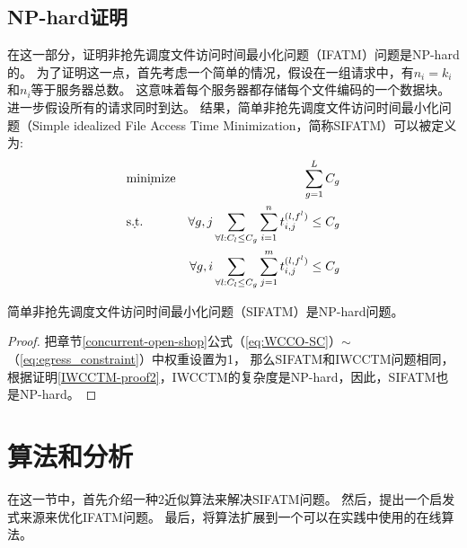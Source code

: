 \subsection{NP-hard证明}
在这一部分，证明非抢先调度文件访问时间最小化问题（IFATM）问题是NP-hard的。
为了证明这一点，首先考虑一个简单的情况，假设在一组请求中，有$n_i = k_i $和$n_i $等于服务器总数。
这意味着每个服务器都存储每个文件编码的一个数据块。
进一步假设所有的请求同时到达。
结果，简单非抢先调度文件访问时间最小化问题（Simple idealized File Access Time
Minimization，简称SIFATM）可以被定义为:
 \begin{eqnarray}
&\d {\rm minimize} & \sum_{g=1}^{L} C_{g} \label{eq:simple_ECSF-SC} \\
& \d{\rm s.t.} &\forall g,j\sum_{\forall l:C_l \leq C_g}\sum_{i=1}^{n}t_{i,j}^{(l,f^l)}\leq C_g  \label{eq:simple_ingress_constraint}\\
&&\forall g,i\sum_{\forall l:C_l \leq C_g}\sum_{j=1}^{m}t_{i,j}^{(l,f^l)} \leq C_g   \label{eq:simple_egress_constraint}
\end{eqnarray}

 \begin{lemma}\label{theorem-SIFATM}
简单非抢先调度文件访问时间最小化问题（SIFATM）是NP-hard问题。
\end{lemma}
\begin{proof}
把章节\ref{concurrent-open-shop}公式（\ref{eq:WCCO-SC}）$\sim$（\ref{eq:egress_constraint}）中权重设置为1，
那么SIFATM和IWCCTM问题相同，根据证明\ref{IWCCTM-proof2}，IWCCTM的复杂度是NP-hard，因此，SIFATM也是NP-hard。
\end{proof}



\section{算法和分析}
\label{erasure_coding:algorithm}
在这一节中，首先介绍一种2近似算法来解决SIFATM问题。
然后，提出一个启发式来源来优化IFATM问题。
最后，将算法扩展到一个可以在实践中使用的在线算法。

